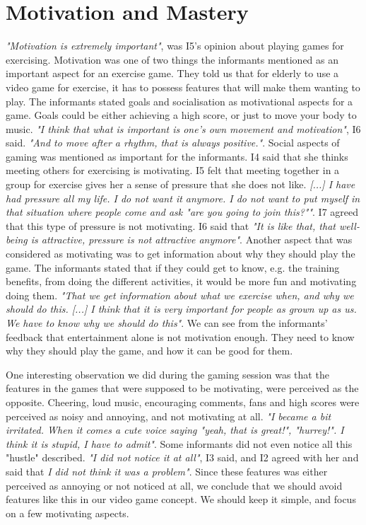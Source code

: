\section{Motivation and Mastery}

\emph{"Motivation is extremely important"}, was I5's opinion about playing games for exercising. Motivation was one of two things the informants mentioned as an important aspect for an exercise game. They told us that for elderly to use a video game for exercise, it has to possess features that will make them wanting to play. The informants stated goals and socialisation as motivational aspects for a game. Goals could be either achieving a high score, or just to move your body to music. \emph{"I think that what is important is one's own movement and motivation"}, I6 said. \emph{"And to move after a rhythm, that is always positive."}. Social aspects of gaming was mentioned as important for the informants. I4 said that she thinks meeting others for exercising is motivating. I5 felt that meeting together in a group for exercise gives her a sense of pressure that she does not like. \emph{[...] I have had pressure all my life. I do not want it anymore. I do not want to put myself in that situation where people come and ask "are you going to join this?""}. I7 agreed that this type of pressure is not motivating. I6 said that \emph{"It is like that, that well-being is attractive, pressure is not attractive anymore"}.  Another aspect that was considered as motivating was to get information about why they should play the game. The informants stated that if they could get to know, e.g. the training benefits, from doing the different activities, it would be more fun and motivating doing them. \emph{"That we get information about what we exercise when, and why we should do this. [...] I think that it is very important for people as grown up as us. We have to know why we should do this"}. We can see from the informants' feedback that entertainment alone is not motivation enough. They need to know why they should play the game, and how it can be good for them. 

One interesting observation we did during the gaming session was that the features in the games that were supposed to be motivating, were perceived as the opposite. Cheering, loud music, encouraging comments, fans and high scores were perceived as noisy and annoying, and not motivating at all. \emph{"I became a bit irritated. When it comes a cute voice saying "yeah, that is great!", "hurrey!". I think it is stupid, I have to admit"}. Some informants did not even notice all this "hustle" described. \emph{"I did not notice it at all"}, I3 said, and I2 agreed with her and said that \emph{I did not think it was a problem"}. Since these features was either perceived as annoying or not noticed at all, we conclude that we should avoid features like this in our video game concept. We should keep it simple, and focus on a few motivating aspects. 

